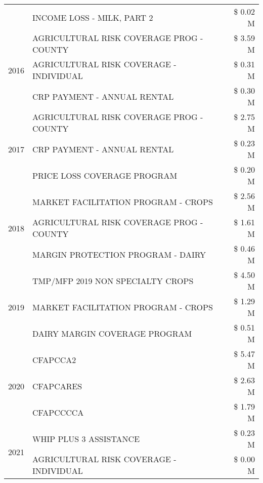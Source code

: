 \begin{tabular}{llr}
 & INCOME LOSS - MILK, PART 2 & \$ 0.02 M \\
\cline{1-3}
\multirow[t]{3}{*}{2016} & AGRICULTURAL RISK COVERAGE PROG - COUNTY & \$ 3.59 M \\
 & AGRICULTURAL RISK COVERAGE - INDIVIDUAL & \$ 0.31 M \\
 & CRP PAYMENT - ANNUAL RENTAL & \$ 0.30 M \\
\cline{1-3}
\multirow[t]{3}{*}{2017} & AGRICULTURAL RISK COVERAGE PROG - COUNTY & \$ 2.75 M \\
 & CRP PAYMENT - ANNUAL RENTAL & \$ 0.23 M \\
 & PRICE LOSS COVERAGE PROGRAM & \$ 0.20 M \\
\cline{1-3}
\multirow[t]{3}{*}{2018} & MARKET FACILITATION PROGRAM - CROPS & \$ 2.56 M \\
 & AGRICULTURAL RISK COVERAGE PROG - COUNTY & \$ 1.61 M \\
 & MARGIN PROTECTION PROGRAM - DAIRY & \$ 0.46 M \\
\cline{1-3}
\multirow[t]{3}{*}{2019} & TMP/MFP 2019 NON SPECIALTY CROPS & \$ 4.50 M \\
 & MARKET FACILITATION PROGRAM - CROPS & \$ 1.29 M \\
 & DAIRY MARGIN COVERAGE PROGRAM & \$ 0.51 M \\
\cline{1-3}
\multirow[t]{3}{*}{2020} & CFAPCCA2 & \$ 5.47 M \\
 & CFAPCARES & \$ 2.63 M \\
 & CFAPCCCCA & \$ 1.79 M \\
\cline{1-3}
\multirow[t]{2}{*}{2021} & WHIP PLUS 3 ASSISTANCE & \$ 0.23 M \\
 & AGRICULTURAL RISK COVERAGE - INDIVIDUAL & \$ 0.00 M \\
\cline{1-3}
\bottomrule
\end{tabular}
